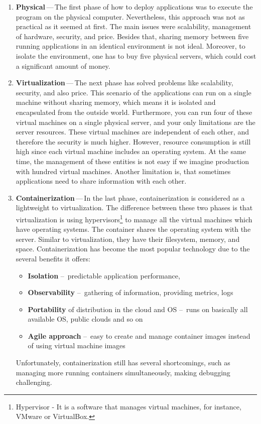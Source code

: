\begin{enumerate}
    \item \textbf{Physical}\,---\,The first phase of how to deploy applications was to execute the program on the physical computer. Nevertheless, this approach was not as practical as it seemed at first. The main issues were scalability, management of hardware, security, and price. Besides that, sharing memory between five running applications in an identical environment is not ideal. Moreover, to isolate the environment, one has to buy five physical servers, which could cost a significant amount of money. 
    
    \item \textbf{Virtualization}\,---\,The next phase has solved problems like scalability, security, and also price. This scenario of the applications can run on a single machine without sharing memory, which means it is isolated and encapsulated from the outside world. Furthermore, you can run four of these virtual machines on a single physical server, and your only limitations are the server resources. These virtual machines are independent of each other, and therefore the security is much higher. However, resource consumption is still high since each virtual machine includes an operating system. At the same time, the management of these entities is not easy if we imagine production with hundred virtual machines. Another limitation is, that sometimes applications need to share information with each other. 
    
    \item \textbf{Containerization}\,---\,In the last phase, containerization is considered as a lightweight to virtualization. The difference between these two phases is that virtualization is using hypervisors\footnote{Hypervisor - It is a software that manages virtual machines, for instance, VMware or VirtualBox.} to manage all the virtual machines which have operating systems. The container shares the operating system with the server. Similar to virtualization, they have their filesystem, memory, and space. Containerization has become the most popular technology due to the several benefits it offers: 
        \begin{itemize}[itemsep=1mm, parsep=0pt]
            \item \textbf{Isolation} \---\ predictable application performance,
            \item \textbf{Observability} \---\ gathering of information, providing metrics, logs
            \item \textbf{Portability} of distribution in the cloud and OS \---\ runs on basically all available OS, public clouds and so on
            \item \textbf{Agile approach} \---\ easy to create and manage container images instead of using virtual machine images
        \end{itemize}
    Unfortunately, containerization still has several shortcomings, such as managing more running containers simultaneously, making debugging challenging.
    

\end{enumerate}
